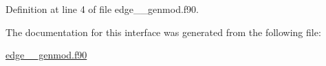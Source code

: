 Definition at line 4 of file edge\+\_\+\+\_\+genmod.\+f90.



The documentation for this interface was generated from the following file\+:\begin{DoxyCompactItemize}
\item 
\hyperlink{edge____genmod_8f90}{edge\+\_\+\+\_\+genmod.\+f90}\end{DoxyCompactItemize}
